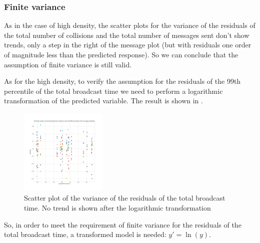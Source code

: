 \subsubsection{Finite variance}\label{ldassumptionsvariance}

As in the case of high density, the scatter plots for the variance of the
residuals of the total number of collisions and the total number of messages
sent don't show trends, only a step in the right of the message plot (but with
residuals one order of magnitude less than the predicted response). So we can
conclude that the assumption of finite variance is still valid.

As for the high density, to verify the assumption for the residuals of the 99th
percentile of the total broadcast time we need to perform a logarithmic
transformation of the predicted variable. The result is shown in
.

\begin{figure}[htb]
	\centering
	\includegraphics[width=0.37\textwidth]{img/ld/broadcasttime-variance-transform}
	\caption{Scatter plot of the variance of the residuals of the total
	broadcast time. No trend is shown after the logarithmic
	transformation}\label{fig:ldtimevariance}
\end{figure}

So, in order to meet the requirement of finite variance for the residuals of the
total broadcast time, a transformed model is needed: \(y' = \ln(y)\).
